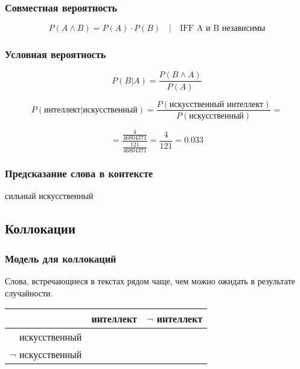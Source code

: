 \documentclass[10pt,svgnames]{beamer}
\begin{document}
\begin{frame}
  \frametitle{Совместная вероятность}
  \large
  \begin{equation}
    P(A \land B) = P(A) \cdot P(B)\quad |\quad \text{IFF A и B независимы}
  \end{equation}

\end{frame}

\begin{frame}
  \frametitle{Условная вероятность}
  \begin{equation}
    P(B|A) = \frac{P(B \land A)}{P(A)}
  \end{equation}

  $$
    P(\text{интеллект}|\text{искусственный}) =
    \frac{P(\text{искусственный интеллект})}{P(\text{искусственный})}
    =$$

    $$
    = \frac{\frac{4}{46804371}}{\frac{121}{46804371}} = \frac{4}{121} = 0.033$$
\end{frame}

\begin{frame}
  \frametitle{Предсказание слова в контексте}
  \begin{block}{}
    сильный искусственный 
  \end{block}
\end{frame}

\subsection{Коллокации}
\begin{frame}
  \frametitle{Модель для коллокаций}
  Слова, встречающиеся в текстах рядом чаще, чем можно ожидать в
  результате случайности.

  \begin{tabular}[c]{r|c|c}
    & интеллект & $\neg$ интеллект \\
    \hline
    искусственный & \\
    \hline
    $\neg$ искусственный & \\
  \end{tabular}
\end{frame}
\end{document}
